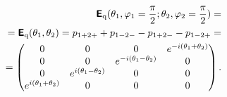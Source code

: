 \begin{equation}
\begin{split}
\textsf{\textbf{E}}_{\text{q}} ( \theta_1,\varphi_1=\frac{\pi}{2}; \theta_2,\varphi_2=\frac{\pi}{2} ) =  \\
=\textsf{\textbf{E}}_{\text{q}} ( \theta_1, \theta_2 ) = p_{1+2+}+ p_{1-2-}  -p_{1+2-} -p_{1-2+}
=  \\ =
\begin{pmatrix}
 0 & 0 & 0 & e^{-i (\theta_1 + \theta_2)} \\
 0 & 0 & e^{-i (\theta_1 -\theta_2)} & 0 \\
 0 & e^{i (\theta_1-  \theta_2)} & 0 & 0 \\
 e^{i (\theta_1+  \theta_2)} & 0 & 0 & 0 \\
\end{pmatrix}
.
\end{split}
\label{e-2017-b-whatever-e2}
\end{equation}

